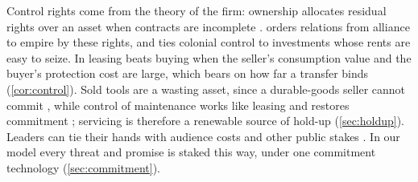 Control rights come from the theory of the firm: ownership allocates residual rights over an asset when contracts are incomplete \citep{grossman1986costs, hart1990property}. \citet{lake1996anarchy} orders relations from alliance to empire by these rights, and \citet{frieden1994international} ties colonial control to investments whose rents are easy to seize. In \citet{harstad2016market} leasing beats buying when the seller's consumption value and the buyer's protection cost are large, which bears on how far a transfer binds (\cref{cor:control}). Sold tools are a wasting asset, since a durable-goods seller cannot commit \citep{coase1972durability, bulow1982durable}, while control of maintenance works like leasing and restores commitment \citep{morita2004durable}; servicing is therefore a renewable source of hold-up (\cref{sec:holdup}). Leaders can tie their hands with audience costs and other public stakes \citep{schelling1960strategy, fearon1994domestic, fearon1997signaling}. In our model every threat and promise is staked this way, under one commitment technology (\cref{sec:commitment}).
